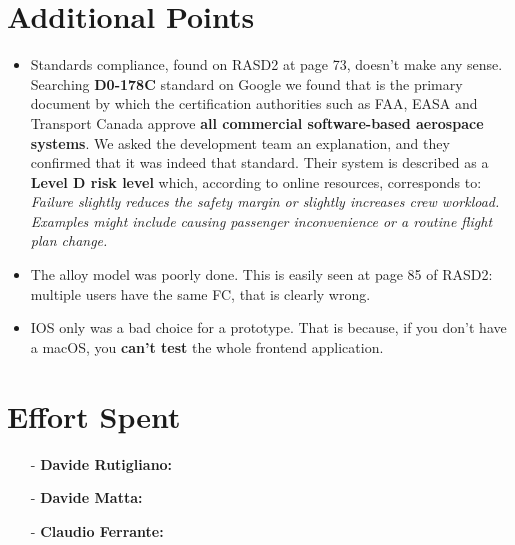\documentclass[a4paper]{article}
\begin{document}
\section{Additional Points}
\begin{itemize}
    \item Standards compliance, found on RASD2 at page 73, doesn't make any sense. Searching \textbf{D0-178C} standard on Google we found that is the primary document by which the certification authorities such as FAA, EASA and Transport Canada approve \textbf{all commercial software-based aerospace systems}. We asked the development team an explanation, and they confirmed that it was indeed that standard.
    Their system is described as a \textbf{Level D risk level} which, according to online resources, corresponds to: \textit{Failure slightly reduces the safety margin or slightly increases crew workload. Examples might include causing passenger inconvenience or a routine flight plan change.}
    \item The alloy model was poorly done. This is easily seen at page 85 of RASD2: multiple users have the same FC, that is clearly wrong.
    \item IOS only was a bad choice for a prototype. That is because, if you don't have a macOS, you \textbf{can't test} the whole frontend application.
\end{itemize}

\newpage
\section{Effort Spent}
    \begin{itemize}
        \item[-] \textbf{Davide Rutigliano:}
        
        \item[-] \textbf{Davide Matta:}
        
        \item[-] \textbf{Claudio Ferrante:}
    \end{itemize}
\end{document}
